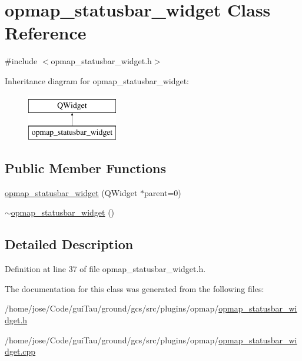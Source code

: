 \hypertarget{classopmap__statusbar__widget}{\section{opmap\-\_\-statusbar\-\_\-widget Class Reference}
\label{classopmap__statusbar__widget}
}


{\ttfamily \#include $<$opmap\-\_\-statusbar\-\_\-widget.\-h$>$}

Inheritance diagram for opmap\-\_\-statusbar\-\_\-widget\-:\begin{figure}[H]
\begin{center}
\leavevmode
\includegraphics[height=2.000000cm]{classopmap__statusbar__widget}
\end{center}
\end{figure}
\subsection*{Public Member Functions}
\begin{DoxyCompactItemize}
\item 
\hyperlink{group___o_p_map_plugin_gacb2a078a376c25f8ca59214a7a231122}{opmap\-\_\-statusbar\-\_\-widget} (Q\-Widget $\ast$parent=0)
\item 
\hyperlink{group___o_p_map_plugin_gaf9e51f27e900dce668581330be2f272f}{$\sim$opmap\-\_\-statusbar\-\_\-widget} ()
\end{DoxyCompactItemize}


\subsection{Detailed Description}


Definition at line 37 of file opmap\-\_\-statusbar\-\_\-widget.\-h.



The documentation for this class was generated from the following files\-:\begin{DoxyCompactItemize}
\item 
/home/jose/\-Code/gui\-Tau/ground/gcs/src/plugins/opmap/\hyperlink{opmap__statusbar__widget_8h}{opmap\-\_\-statusbar\-\_\-widget.\-h}\item 
/home/jose/\-Code/gui\-Tau/ground/gcs/src/plugins/opmap/\hyperlink{opmap__statusbar__widget_8cpp}{opmap\-\_\-statusbar\-\_\-widget.\-cpp}\end{DoxyCompactItemize}
